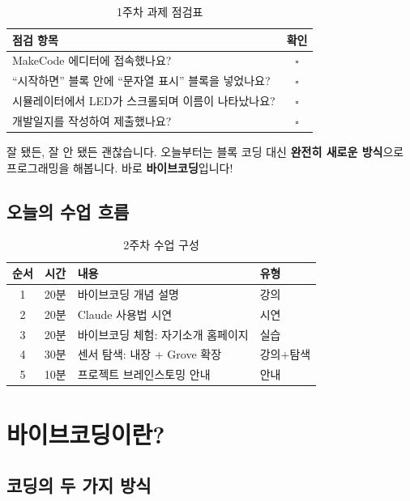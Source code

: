 \documentclass[11pt, a4paper]{article}
\begin{document}
\begin{table}[H]\centering
\caption{1주차 과제 점검표}
\begin{tabular}{lc}\toprule
\textbf{점검 항목} & \textbf{확인} \\\midrule
MakeCode 에디터에 접속했나요? & $\square$ \\
``시작하면'' 블록 안에 ``문자열 표시'' 블록을 넣었나요? & $\square$ \\
시뮬레이터에서 LED가 스크롤되며 이름이 나타났나요? & $\square$ \\
개발일지를 작성하여 제출했나요? & $\square$ \\
\bottomrule
\end{tabular}
\end{table}

잘 됐든, 잘 안 됐든 괜찮습니다. 오늘부터는 블록 코딩 대신 \textbf{완전히 새로운 방식}으로 프로그래밍을 해봅니다. 바로 \textbf{바이브코딩}입니다!

\subsection{오늘의 수업 흐름}

\begin{table}[H]\centering
\caption{2주차 수업 구성}
\begin{tabular}{ccll}\toprule
\textbf{순서} & \textbf{시간} & \textbf{내용} & \textbf{유형} \\\midrule
1 & 20분 & 바이브코딩 개념 설명 & 강의 \\
2 & 20분 & Claude 사용법 시연 & 시연 \\
3 & 20분 & 바이브코딩 체험: 자기소개 홈페이지 & 실습 \\
4 & 30분 & 센서 탐색: 내장 + Grove 확장 & 강의+탐색 \\
5 & 10분 & 프로젝트 브레인스토밍 안내 & 안내 \\
\bottomrule
\end{tabular}
\end{table}

\section{바이브코딩이란?}

\subsection{코딩의 두 가지 방식}
\end{document}

